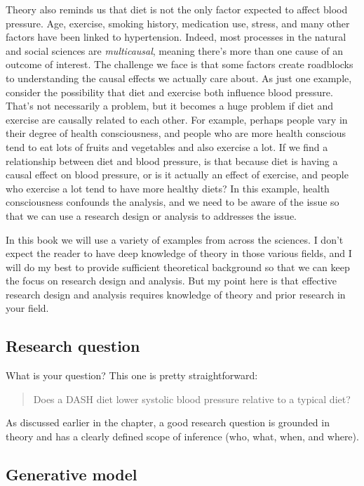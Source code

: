 \documentclass[
]{book}
\begin{document}
Theory also reminds us that diet is not the only factor expected to affect blood pressure. Age, exercise, smoking history, medication use, stress, and many other factors have been linked to hypertension. Indeed, most processes in the natural and social sciences are \emph{multicausal}, meaning there's more than one cause of an outcome of interest. The challenge we face is that some factors create roadblocks to understanding the causal effects we actually care about. As just one example, consider the possibility that diet and exercise both influence blood pressure. That's not necessarily a problem, but it becomes a huge problem if diet and exercise are causally related to each other. For example, perhaps people vary in their degree of health consciousness, and people who are more health conscious tend to eat lots of fruits and vegetables and also exercise a lot. If we find a relationship between diet and blood pressure, is that because diet is having a causal effect on blood pressure, or is it actually an effect of exercise, and people who exercise a lot tend to have more healthy diets? In this example, health consciousness confounds the analysis, and we need to be aware of the issue so that we can use a research design or analysis to addresses the issue.

In this book we will use a variety of examples from across the sciences. I don't expect the reader to have deep knowledge of theory in those various fields, and I will do my best to provide sufficient theoretical background so that we can keep the focus on research design and analysis. But my point here is that effective research design and analysis requires knowledge of theory and prior research in your field.

\subsection{Research question}\label{research-question}

What is your question? This one is pretty straightforward:

\begin{quote}
Does a DASH diet lower systolic blood pressure relative to a typical diet?
\end{quote}

As discussed earlier in the chapter, a good research question is grounded in theory and has a clearly defined scope of inference (who, what, when, and where).

\subsection{Generative model}\label{generative-model}
\end{document}
